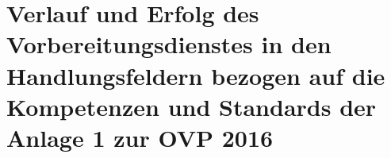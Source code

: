 {	\section*{%
		Verlauf und Erfolg des Vorbereitungsdienstes in den Handlungsfeldern bezogen auf die Kompetenzen
		und Standards der Anlage 1 zur OVP 2016
	}
}

\AtBeginDocument{\maketitle}

\newcommand{\schule@handlungsfeldStart}[4][]{%
	\begin{tcolorbox}[title={\bfseries\sffamily #3}, #1]
		\footnotesize
		\begin{enumerate}[label={Kompetenz \arabic*:},left=0pt,start=#2]
			#4
		\end{enumerate}
		\tcblower
		\normalfont
}
\newcommand{\schule@handlungsfeldEnd}[1][]{%
	\end{tcolorbox}

	\vspace{2em}
}
\newenvironment{handlungsfeld1}[1][]{%
	\schule@handlungsfeldStart[#1]{4}{Vielfalt als Herausforderung annehmen und als Chance nutzen}{%
		\item Lehrerinnen und Lehrer kennen die sozialen und kulturellen Lebensbedingungen, etwaige
				Benachteiligungen, Beeinträchtigungen -- auch gesundheitliche -- und Barrieren der Entwicklung
				des Lernens von Schülerinnen und Schülern und für Schülerinnen und Schüler und  nehmen im
				Rahmen der Schule Einfluss auf deren individuelle Entwicklung.
	}
}{%
	\schule@handlungsfeldEnd
}
\newenvironment{handlungsfeld2}[1][]{%
	\schule@handlungsfeldStart[#1]{1}{Unterricht für heterogene Lerngruppen gestalten und Lernprozesse
	nachhaltig anlegen}{%
		\item Lehrerinnen und Lehrer planen Unterricht unter Berücksichtigung unterschiedlicher
			Lernvoraussetzungen und Entwicklungsprozesse fach- und sachgerecht und führen ihn sachlich und
			fachlich korrekt durch.
		\item Lehrerinnen und Lehrer unterstützen durch die Gestaltung von Lernsituationen das Lernen
			von Schülerinnen und Schülern. Sie motivieren Schülerinnen und Schüler und befähigen sie,
			Zusammenhänge herzustellen und Gelerntes zu nutzen.
		\item Lehrerinnen und Lehrer fördern die Fähigkeiten von Schülerinnen und Schülern zum
			selbstbestimmten Lernen und Arbeiten.
	}
}{%
	\schule@handlungsfeldEnd
}
